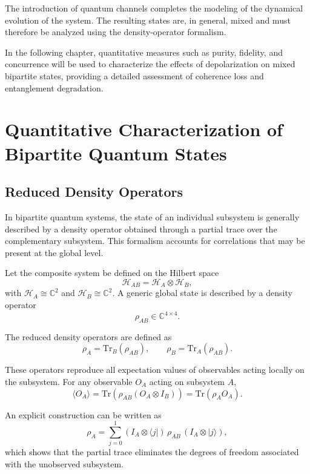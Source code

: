 \documentclass[a4paper]{article}
\begin{document}
The introduction of quantum channels completes the modeling of the dynamical evolution of the system. The resulting states are, in general, mixed and must therefore be analyzed using the density-operator formalism.

In the following chapter, quantitative measures such as purity, fidelity, and concurrence will be used to characterize the effects of depolarization on mixed bipartite states, providing a detailed assessment of coherence loss and entanglement degradation.



\section{Quantitative Characterization of Bipartite Quantum States}

\subsection{Reduced Density Operators}

In bipartite quantum systems, the state of an individual subsystem is generally described by a density operator obtained through a partial trace over the complementary subsystem. This formalism accounts for correlations that may be present at the global level.

Let the composite system be defined on the Hilbert space
\[
\mathcal{H}_{AB} = \mathcal{H}_A \otimes \mathcal{H}_B,
\]
with $\mathcal{H}_A \cong \mathbb{C}^2$ and $\mathcal{H}_B \cong \mathbb{C}^2$. A generic global state is described by a density operator
\[
\rho_{AB} \in \mathbb{C}^{4 \times 4}.
\]

The reduced density operators are defined as
\[
\rho_A = \mathrm{Tr}_B(\rho_{AB}), \qquad
\rho_B = \mathrm{Tr}_A(\rho_{AB}).
\]

These operators reproduce all expectation values of observables acting locally on the subsystem. For any observable $O_A$ acting on subsystem $A$,
\[
\langle O_A \rangle = \mathrm{Tr}(\rho_{AB}(O_A \otimes I_B)) = \mathrm{Tr}(\rho_A O_A).
\]

An explicit construction can be written as
\[
\rho_A = \sum_{j=0}^{1} (I_A \otimes \langle j|)\,\rho_{AB}\,(I_A \otimes |j\rangle),
\]
which shows that the partial trace eliminates the degrees of freedom associated with the unobserved subsystem.
\end{document}
